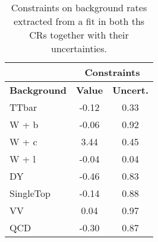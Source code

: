 \documentclass[10pt]{article}
\begin{document}
\begin{table}[!ht]
\begin{center}
\begin{tabular}{|l|c|c|}
\hline
\hline
& \multicolumn{2}{c|}{\textbf{Constraints}} \\
\hline
\hline
\textbf{Background} & \textbf{ Value} & \textbf{Uncert.} \\
\hline
TTbar            & -0.12 & 0.33    \\
W + b            & -0.06 & 0.92    \\
W + c            &  3.44 & 0.45    \\
W + l            & -0.04 & 0.04    \\
DY               & -0.46 & 0.83    \\
SingleTop        & -0.14 & 0.88    \\
VV               &  0.04 & 0.97    \\
QCD              & -0.30 & 0.87    \\
\hline
\hline

\hline
\hline
\end{tabular}
\caption{Constraints on background rates extracted from a fit in both ths CRs together with their uncertainties.}
\label{tab:SFtable}
\end{center}
\end{table} 
\end{document}
